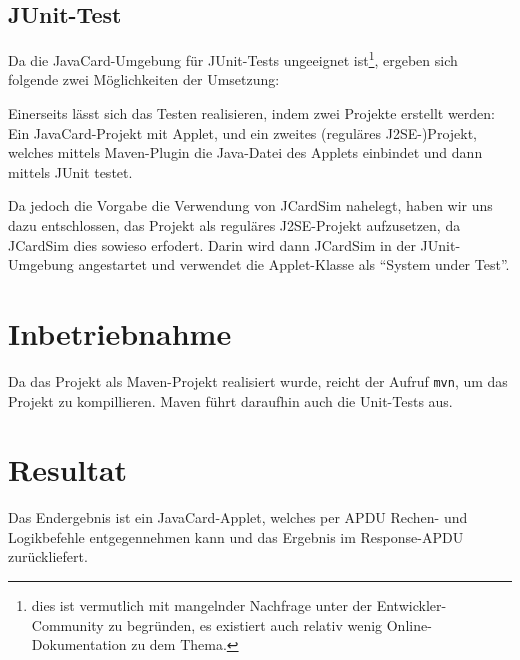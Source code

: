 \documentclass[paper=a4, fontsize=11pt]{scrartcl}
\begin{document}
\subsection{JUnit-Test}
Da die JavaCard-Umgebung für JUnit-Tests ungeeignet ist\footnote{dies ist vermutlich mit mangelnder Nachfrage unter der Entwickler-Community zu begründen, es existiert auch relativ wenig Online-Dokumentation zu dem Thema.}, ergeben sich folgende zwei Möglichkeiten der Umsetzung:

Einerseits lässt sich das Testen realisieren, indem zwei Projekte erstellt werden: Ein JavaCard-Projekt mit Applet, und ein zweites (reguläres J2SE-)Projekt, welches mittels Maven-Plugin die Java-Datei des Applets einbindet und dann mittels JUnit testet.

Da jedoch die Vorgabe die Verwendung von JCardSim nahelegt, haben wir uns dazu entschlossen, das Projekt als reguläres J2SE-Projekt aufzusetzen, da JCardSim dies sowieso erfodert. Darin wird dann JCardSim in der JUnit-Umgebung angestartet und verwendet die Applet-Klasse als \enquote{System under Test}.

\section{Inbetriebnahme}

Da das Projekt als Maven-Projekt realisiert wurde, reicht der Aufruf \texttt{mvn}, um das Projekt zu kompillieren. Maven führt daraufhin auch die Unit-Tests aus.

\section{Resultat}
Das Endergebnis ist ein JavaCard-Applet, welches per APDU Rechen- und Logikbefehle entgegennehmen kann und das Ergebnis im Response-APDU zurückliefert.
\end{document}

